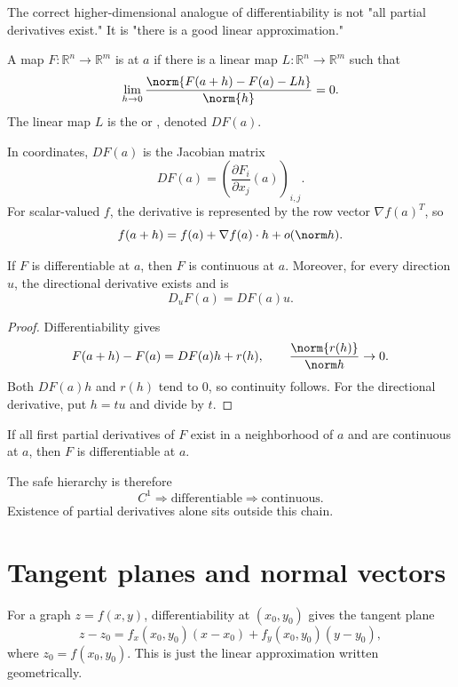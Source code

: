 The correct higher-dimensional analogue of differentiability is not "all partial derivatives exist."  It is "there is a good linear approximation."

\begin{definition}
A map \(F:\mathbb R^n\to\mathbb R^m\) is  at \(a\) if there is a linear map \(L:\mathbb R^n\to\mathbb R^m\) such that
\[
  \lim_{h\to0}\frac{\norm{F(a+h)-F(a)-Lh}}{\norm{h}}=0.
\]
The linear map \(L\) is the  or , denoted \(DF(a)\).
\end{definition}

In coordinates, \(DF(a)\) is the Jacobian matrix
\[
  DF(a)=\left(\frac{\partial F_i}{\partial x_j}(a)\right)_{i,j}.
\]
For scalar-valued \(f\), the derivative is represented by the row vector \(\nabla f(a)^T\), so
\[
  f(a+h)=f(a)+\nabla f(a)\cdot h+o(\norm h).
\]

\begin{proposition}
If \(F\) is differentiable at \(a\), then \(F\) is continuous at \(a\).  Moreover, for every direction \(u\), the directional derivative exists and is
\[
  D_uF(a)=DF(a)u.
\]
\end{proposition}

\begin{proof}
Differentiability gives
\[
  F(a+h)-F(a)=DF(a)h+r(h),
  \qquad \frac{\norm{r(h)}}{\norm h}\to0.
\]
Both \(DF(a)h\) and \(r(h)\) tend to \(0\), so continuity follows.  For the directional derivative, put \(h=tu\) and divide by \(t\).
\end{proof}

\begin{theorem}
If all first partial derivatives of \(F\) exist in a neighborhood of \(a\) and are continuous at \(a\), then \(F\) is differentiable at \(a\).
\end{theorem}

The safe hierarchy is therefore
\[
  C^1\Longrightarrow \text{differentiable}
  \Longrightarrow \text{continuous}.
\]
Existence of partial derivatives alone sits outside this chain.

\section{Tangent planes and normal vectors}

For a graph \(z=f(x,y)\), differentiability at \((x_0,y_0)\) gives the tangent plane
\[
  z-z_0=f_x(x_0,y_0)(x-x_0)+f_y(x_0,y_0)(y-y_0),
\]
where \(z_0=f(x_0,y_0)\).  This is just the linear approximation written geometrically.


